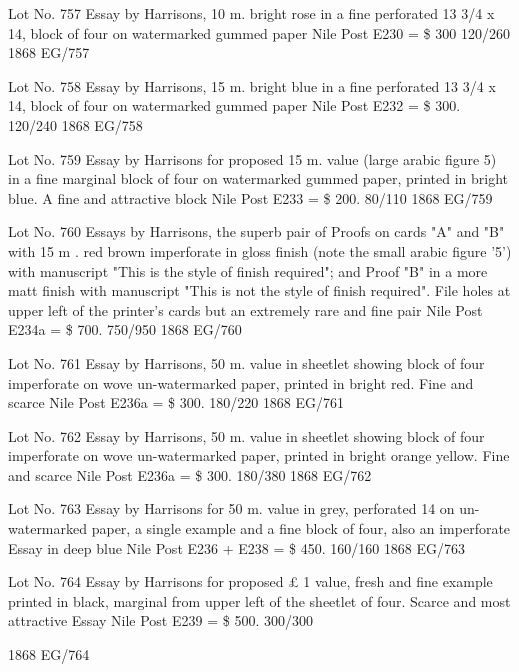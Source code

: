 \documentclass[justified]{tufte-book}
\begin{document}
%
{Lot No. 757
Essay by Harrisons, 10 m. bright rose in a fine perforated 13 3/4 x 14, block of four on watermarked gummed paper Nile Post E230 = \$ 300 120/260
}%
{1868}%
{EG/757}%
{}%
{}
{}%
{}

%
{Lot No. 758
Essay by Harrisons, 15 m. bright blue in a fine perforated 13 3/4 x 14, block of four on watermarked gummed paper Nile Post E232 = \$ 300. 120/240
}%
{1868}%
{EG/758}%
{}%
{}
{}%
{}

%
{Lot No. 759
Essay by Harrisons for proposed 15 m. value (large arabic figure 5) in a fine marginal block of four on watermarked gummed paper, printed in bright blue. A fine and attractive block Nile Post E233 = \$ 200. 80/110
}%
{1868}%
{EG/759}%
{}%
{}
{}%
{}

%
{Lot No. 760
Essays by Harrisons, the superb pair of Proofs on cards "A" and "B" with 15 m . red brown imperforate in gloss finish (note the small arabic figure '5') with manuscript "This is the style of finish required"; and Proof "B" in a more matt finish with manuscript "This is not the style of finish required". File holes at upper left of the printer's cards but an extremely rare and fine pair Nile Post E234a = \$ 700. 750/950
}%
{1868}%
{EG/760}%
{}%
{}
{}%
{}

%
{Lot No. 761
Essay by Harrisons, 50 m. value in sheetlet showing block of four imperforate on wove un-watermarked paper, printed in bright red. Fine and scarce Nile Post E236a = \$ 300. 180/220
}%
{1868}%
{EG/761}%
{}%
{}
{}%
{}

%
{Lot No. 762
Essay by Harrisons, 50 m. value in sheetlet showing block of four imperforate on wove un-watermarked paper, printed in bright orange yellow. Fine and scarce Nile Post E236a = \$ 300. 180/380
}%
{1868}%
{EG/762}%
{}%
{}
{}%
{}

%
{
Lot No. 763
Essay by Harrisons for 50 m. value in grey, perforated 14 on un-watermarked paper, a single example and a fine block of four, also an imperforate Essay in deep blue Nile Post E236 + E238 = \$ 450. 160/160
}%
{1868}%
{EG/763}%
{}%
{}
{}%
{}

%
{Lot No. 764
Essay by Harrisons for proposed £ 1 value, fresh and fine example printed in black, marginal from upper left of the sheetlet of four. Scarce and most attractive Essay Nile Post E239 = \$ 500. 300/300

}%
{1868}%
{EG/764}%
{}%
{}
{}%
{}
\end{document}
